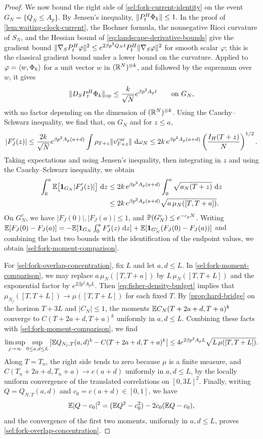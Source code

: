 \begin{proof}
We now bound the right side of \eqref{sel:fork-current-identity} on the
event $G_N=\{Q_N\le A_p\}$. By Jensen's inequality,
$\lVert P^H_t\Phi_k\rVert\le1$. In the proof of \cref{lem:waiting-clock-current},
the Bochner formula, the nonnegative Ricci curvature of $S_N$, and the Hessian bound of \eqref{eq:landscape-derivative-bounds} give the gradient
bound $\lVert\nabla_SP^H_t\varphi\rVert^2\le e^{2\beta p^2Q_Nt}P^H_t\lVert\nabla_S\varphi\rVert^2$
for smooth scalar $\varphi$; this is the classical gradient bound under a
lower bound on the curvature. Applied to $\varphi=\left\langle w,\Phi_k\right\rangle$ for a unit
vector $w$ in $(\mathbb R^N)^{\otimes k}$, and followed by the supremum over $w$, it
gives
\[
 \lVert D_SP^H_t\Phi_k\rVert_{\mathrm{op}}\le\frac k{\sqrt N}e^{\beta p^2A_pt}
 \qquad\text{on }G_N,
\]
with no factor depending on the dimension of $(\mathbb R^N)^{\otimes k}$. Using the
Cauchy--Schwarz inequality, we find that, on $G_N$ and for $z\le a$,
\[
 |F_J'(z)|\le\frac{2k}{\sqrt N}e^{\beta p^2A_p(a+d)}
 \int\rho_{T+z}\lVert v^{\mathrm{cur}}_{T+z}\rVert\,\mathop{}\!\mathrm d\omega_N
 \le2k\,e^{\beta p^2A_p(a+d)}\left(\frac{I_H(T+z)}N\right)^{1/2}.
\]
Taking expectations and using Jensen's inequality, then integrating in $z$
and using the Cauchy--Schwarz inequality, we obtain
\[
\begin{aligned}
 \int_0^a\mathbb E\big[\mathbf 1_{G_N}|F_J'(z)|\big]\,\mathop{}\!\mathrm d z
 &\le2k\,e^{\beta p^2A_p(a+d)}\int_0^a\sqrt{a_N(T+z)}\,\mathop{}\!\mathrm d z\\
 &\le2k\,e^{\beta p^2A_p(a+d)}\sqrt{a\,\mu_N([T,T+a])}.
\end{aligned}
\]
On $G_N^c$, we have $|F_J(0)|,|F_J(a)|\le1$, and $\mathbb P(G_N^c)\le e^{-c_pN}$.
Writing
$\mathbb E[F_J(0)-F_J(a)]=-\mathbb E[\mathbf 1_{G_N}\int_0^aF_J'(z)\,\mathop{}\!\mathrm d z]+\mathbb E[\mathbf 1_{G_N^c}(F_J(0)-F_J(a))]$
and combining the last two bounds with the identification of the endpoint
values, we obtain \eqref{sel:fork-moment-comparison}.

For \eqref{sel:fork-overlap-concentration}, fix $L$ and let $a,d\le L$. In
\eqref{sel:fork-moment-comparison}, we may replace $a\,\mu_N([T,T+a])$ by
$L\,\mu_N([T,T+L])$ and the exponential factor by $e^{2\beta p^2A_pL}$. Then
\eqref{eq:fisher-density-budget} implies that
$\mu_{N_j}([T,T+L])\to\mu([T,T+L])$ for each fixed $T$. By
\cref{prop:hard-bridge} on the horizon $T+3L$ and $|C_N|\le1$, the moments
$\mathbb E C_N(T+2a+d,T+a)^k$ converge to $C(T+2a+d,T+a)^k$ uniformly in
$a,d\le L$. Combining these facts with \eqref{sel:fork-moment-comparison},
we find
\[
 \limsup_{j\to\infty}\sup_{0\le a,d\le L}
 \left|\mathbb E Q_{N_j,T}(a,d)^k-C(T+2a+d,T+a)^k\right|
 \le4e^{2\beta p^2A_pL}\sqrt{L\,\mu([T,T+L])}.
\]
Along $T=T_n$, the right side tends to zero because $\mu$ is a finite
measure, and $C(T_n+2a+d,T_n+a)\to c(a+d)$ uniformly in $a,d\le L$, by the
locally uniform convergence of the translated correlations on
$[0,3L]^2$. Finally, writing $Q=Q_{N,T}(a,d)$ and $c_0=c(a+d)\in[0,1]$, we
have
\[
 \mathbb E|Q-c_0|^2=(\mathbb E Q^2-c_0^2)-2c_0(\mathbb E Q-c_0),
\]
and the convergence of the first two moments, uniformly in $a,d\le L$,
proves \eqref{sel:fork-overlap-concentration}.
\end{proof}

